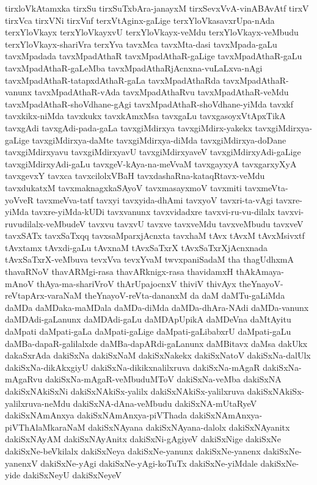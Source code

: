 {tirxloVkAtamxka
tirxSu
tirxSuTxbAra-janayxM
tirxSevxVvA-vinABAvAtf
tirxV
tirxVca
tirxVNi
tirxVnf
terxVtAginx-gaLige
terxYloVkasavxrUpa-nAda
terxYloVkayx
terxYloVkayxvU
terxYloVkayx-veMdu
terxYloVkayx-veMbudu
terxYloVkayx-shariVra
terxYva
tavxMca
tavxMta-dasi
tavxMpada-gaLu
tavxMpadada
tavxMpadAthaR
tavxMpadAthaR-gaLige
tavxMpadAthaR-gaLu
tavxMpadAthaR-gaLeMba
tavxMpadAthaRjAcnxna-vuLaLxva-nAgi
tavxMpadAthaR-tatapxdAthaR-gaLa
tavxMpadAthaRda
tavxMpadAthaR-vanunx
tavxMpadAthaR-vAda
tavxMpadAthaRvu
tavxMpadAthaR-veMdu
tavxMpadAthaR-shoVdhane-gAgi
tavxMpadAthaR-shoVdhane-yiMda
tavxkf
tavxkikx-niMda
tavxkukx
tavxkAmxMsa
tavxgaLu
tavxgasoyxVtApxTikA
tavxgAdi
tavxgAdi-pada-gaLa
tavxgiMdirxya
tavxgiMdirx-yakekx
tavxgiMdirxya-gaLige
tavxgiMdirxya-daMte
tavxgiMdirxya-diMda
tavxgiMdirxya-doDane
tavxgiMdirxyavu
tavxgiMdirxyavU
tavxgiMdirxyaveV
tavxgiMdirxyAdi-gaLige
tavxgiMdirxyAdi-gaLu
tavxgeV-kAya-na-meVvaM
tavxgayxyA
tavxgarxyXyA
tavxgevxY
tavxca
tavxcilolxVBaH
tavxdashaRna-kataqRtavx-veMdu
tavxdukatxM
tavxmaknagxkaSAyoV
tavxmasayxmoV
tavxmiti
tavxmeVta-yoVveR
tavxmeVva-tatf
tavxyi
tavxyida-dhAmi
tavxyoV
tavxri-ta-vAgi
tavxre-yiMda
tavxre-yiMda-kUDi
tavxvanunx
tavxvidadxre
tavxvi-ru-vu-dilalx
tavxvi-ruvudilalx-veMbudeV
tavxvu
tavxvU
tavxve
tavxveMdu
tavxveMbudu
tavxveV
tavxSATx
tavxSaTxqq
tavxsaMparxjAcnxta
tavxhaM
tAvx
tAvxM
tAvxMsivxtf
tAvxtamx
tAvxdi-gaLu
tAvxnaM
tAvxSaTxrX
tAvxSaTxrXjAcnxnada
tAvxSaTxrX-veMbuva
tevxVva
tevxYvaM
twvxpaniSadaM
tha
thagUdhxmA
thavaRNoV
thavARMgi-rasa
thavARknigx-rasa
thavidamxH
thAkAmaya-mAnoV
thAya-ma-shariVroV
thArUpajocnxV
thiviV
thivAyx
theYnayoV-reVtapArx-varaNaM
theYnayoV-reVta-dananxM
da
daM
daMTu-gaLiMda
daMDa
daMDaka-maMDala
daMDa-diMda
daMDa-dhAra-NAdi
daMDa-vanunx
daMDAdi-gaLanunx
daMDAdi-gaLu
daMDApUpikA
daMDeVna
daMtAyitu
daMpati
daMpati-gaLa
daMpati-gaLige
daMpati-gaLibabxrU
daMpati-gaLu
daMBa-dapaR-galilalxde
daMBa-dapARdi-gaLanunx
daMBitavx
daMsa
dakUkx
dakaSxrAda
dakiSxNa
dakiSxNaM
dakiSxNakekx
dakiSxNatoV
dakiSxNa-dalUlx
dakiSxNa-dikAkxgiyU
dakiSxNa-dikikxnalilxruva
dakiSxNa-mAgaR
dakiSxNa-mAgaRvu
dakiSxNa-mAgaR-veMbuduMToV
dakiSxNa-veMba
dakiSxNA
dakiSxNAkiSxNi
dakiSxNAkiSx-yalilx
dakiSxNAkiSx-yalilxruva
dakiSxNAkiSx-yalilxruva-neMdu
dakiSxNA-dAna-veMbudu
dakiSxNA-mUtaRyeV
dakiSxNAmAnxya
dakiSxNAmAnxya-piVThada
dakiSxNAmAnxya-piVThAlaMkaraNaM
dakiSxNAyana
dakiSxNAyana-dalolx
dakiSxNAyanitx
dakiSxNAyAM
dakiSxNAyAnitx
dakiSxNi-gAgiyeV
dakiSxNige
dakiSxNe
dakiSxNe-beVkilalx
dakiSxNeya
dakiSxNe-yanunx
dakiSxNe-yanenx
dakiSxNe-yanenxV
dakiSxNe-yAgi
dakiSxNe-yAgi-koTuTx
dakiSxNe-yiMdale
dakiSxNe-yide
dakiSxNeyU
dakiSxNeyeV
}
